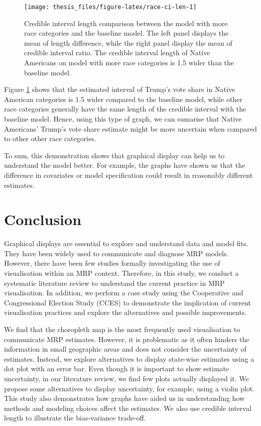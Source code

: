 \documentclass{monashthesis}
\begin{document}
\begin{figure}
\texttt{[image: thesis\_files/figure-latex/race-ci-len-1]} \caption{Credible interval length comparison between the model with more race categories and the baseline model. The left panel displays the mean of length difference, while the right panel display the mean of credible interval ratio. The credible interval length of Native Americans on model with more race categories is 1.5 wider than the baseline model.}\label{fig:race-ci-len}
\end{figure}

Figure \ref{fig:race-ci-len} shows that the estimated interval of Trump's vote share in Native American categories is 1.5 wider compared to the baseline model, while other race categories generally have the same length of the credible interval with the baseline model. Hence, using this type of graph, we can sumarise that Native Americans' Trump's vote share estimate might be more uncertain when compared to other other race categories.

To sum, this demonstration shows that graphical display can help us to understand the model better. For example, the graphs have shown us that the difference in covariates or model specification could result in reasonably different estimates.

\hypertarget{ch:conclusion}{%
\chapter{Conclusion}\label{ch:conclusion}}

Graphical displays are essential to explore and understand data and model fits. They have been widely used to communicate and diagnose MRP models. However, there have been few studies formally investigating the use of visualisation within an MRP context. Therefore, in this study, we conduct a systematic literature review to understand the current practice in MRP visualisation. In addition, we perform a case study using the Cooperative and Congressional Election Study (CCES) to demonstrate the implication of current visualisation practices and explore the alternatives and possible improvements.

We find that the choropleth map is the most frequently used visualisation to communicate MRP estimates. However, it is problematic as it often hinders the information in small geographic areas and does not consider the uncertainty of estimates. Instead, we explore alternatives to display state-wise estimates using a dot plot with an error bar.
Even though it is important to show estimate uncertainty, in our literature review, we find few plots actually displayed it. We propose some alternatives to display uncertainty, for example, using a violin plot. This study also demonstrates how graphs have aided us in understanding how methods and modeling choices affect the estimates. We also use credible interval length to illustrate the bias-variance trade-off.
\end{document}
